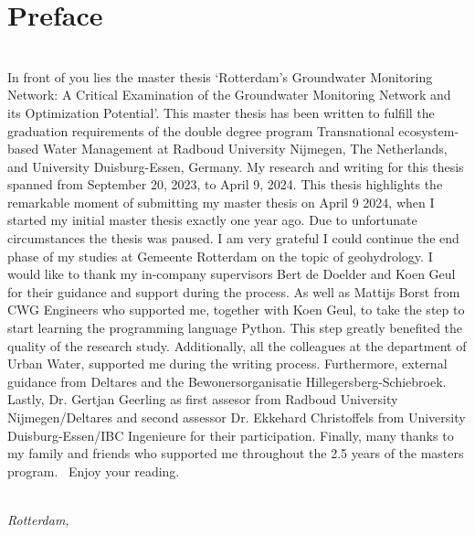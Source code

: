 \chapter*{Preface}

\emph{ }\\
In front of you lies the master thesis ‘Rotterdam’s Groundwater Monitoring Network: A Critical Examination of the Groundwater Monitoring Network and its Optimization Potential’. This master thesis has been written to fulfill the graduation requirements of the double degree program Transnational ecosystem-based Water Management at Radboud University Nijmegen, The Netherlands, and University Duisburg-Essen, Germany. My research and writing for this thesis spanned from September 20, 2023, to April 9, 2024.
\newline
\newline
This thesis highlights the remarkable moment of submitting my master thesis on April 9 2024, when I started my initial master thesis exactly one year ago. Due to unfortunate circumstances the thesis was paused. I am very grateful I could continue the end phase of my studies at Gemeente Rotterdam on the topic of geohydrology.
\newline
\newline
I would like to thank my in-company supervisors Bert de Doelder and Koen Geul for their guidance and support during the process. As well as Mattijs Borst from CWG Engineers who supported me, together with Koen Geul, to take the step to start learning the programming language Python. This step greatly benefited the quality of the research study. Additionally, all the colleagues at the department of Urban Water, supported me during the writing process. Furthermore, external guidance from Deltares and the Bewonersorganisatie Hillegersberg-Schiebroek. Lastly, Dr. Gertjan Geerling as first assesor from Radboud University Nijmegen/Deltares and second assessor Dr. Ekkehard Christoffels from University Duisburg-Essen/IBC Ingenieure for their participation.
\newline
\newline
Finally, many thanks to my family and friends who supported me throughout the 2.5 years of the masters program. 
\newline
\newline
Enjoy your reading.
\bigskip

\begin{flushright}
{\makeatletter\itshape
    \@author \\
    Rotterdam, \monthname{} \the\year{}
\makeatother}
\end{flushright}

